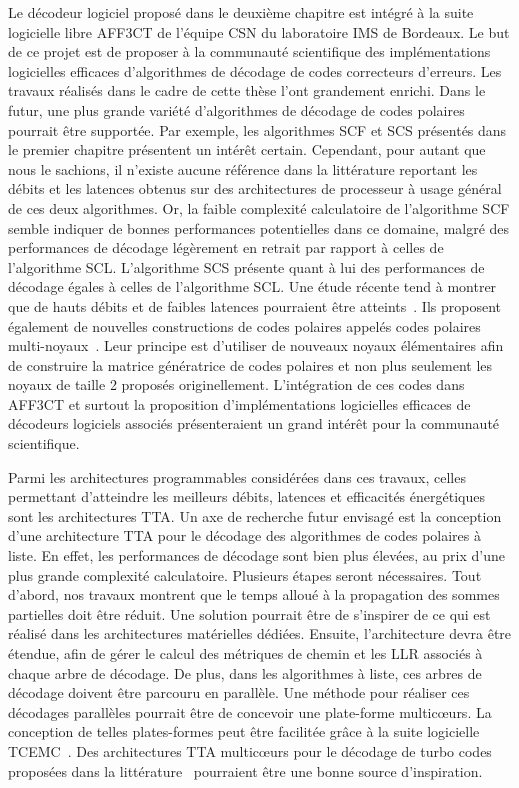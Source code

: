 Le décodeur logiciel proposé dans le deuxième chapitre est intégré à la suite logicielle libre AFF3CT de l'équipe CSN du laboratoire IMS de Bordeaux. Le but de ce projet est de proposer à la communauté scientifique des implémentations logicielles efficaces d'algorithmes de décodage de codes correcteurs d'erreurs. Les travaux réalisés dans le cadre de cette thèse l'ont grandement enrichi. Dans le futur, une plus grande variété d'algorithmes de décodage de codes polaires pourrait être supportée. Par exemple, les algorithmes SCF et SCS présentés dans le premier chapitre présentent un intérêt certain. Cependant, pour autant que nous le sachions, il n'existe aucune référence dans la littérature reportant les débits et les latences obtenus sur des architectures de processeur à usage général de ces deux algorithmes. Or, la faible complexité calculatoire de l'algorithme SCF semble indiquer de bonnes performances potentielles dans ce domaine, malgré des performances de décodage légèrement en retrait par rapport à celles de l'algorithme SCL. L'algorithme SCS présente quant à lui des performances de décodage égales à celles de l'algorithme SCL. Une étude récente tend à montrer que de hauts débits et de faibles latences pourraient être atteints~\cite{8351832}. Ils proposent également de nouvelles constructions de codes polaires appelés codes polaires multi-noyaux~\cite{7962750,8254147}. Leur principe est d'utiliser de nouveaux noyaux élémentaires afin de construire la matrice génératrice de codes polaires et non plus seulement les noyaux de taille 2 proposés originellement. L'intégration de ces codes dans AFF3CT et surtout la proposition d'implémentations logicielles efficaces de décodeurs logiciels associés présenteraient un grand intérêt pour la communauté scientifique.

Parmi les architectures programmables considérées dans ces travaux, celles permettant d'atteindre les meilleurs débits, latences et efficacités énergétiques sont les architectures TTA.
Un axe de recherche futur envisagé est la conception d'une architecture TTA pour le décodage des algorithmes de codes polaires à liste.
En effet, les performances de décodage sont bien plus élevées, au prix d'une plus grande complexité calculatoire.
Plusieurs étapes seront nécessaires. Tout d'abord, nos travaux montrent que le temps alloué à la propagation des sommes partielles doit être réduit.
Une solution pourrait être de s'inspirer de ce qui est réalisé dans les architectures matérielles dédiées.
Ensuite, l'architecture devra être étendue, afin de gérer le calcul des métriques de chemin et les LLR associés à chaque arbre de décodage. De plus, dans les algorithmes à liste, ces arbres de décodage doivent être parcouru en parallèle. Une méthode pour réaliser ces décodages parallèles pourrait être de concevoir une plate-forme multicœurs. La conception de telles plates-formes peut être facilitée grâce à la suite logicielle TCEMC~\cite{tcemc_2011}. Des architectures TTA multicœurs pour le décodage de turbo codes proposées dans la littérature~\cite{kultala_turbo_2013} pourraient être une bonne source d'inspiration.

